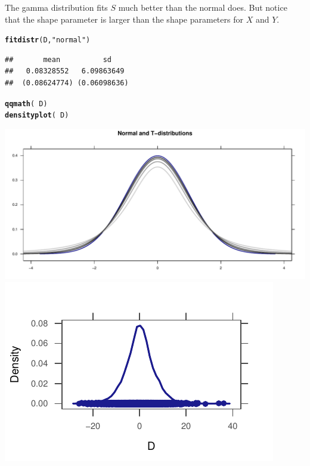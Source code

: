 \documentclass[twoside]{book}\usepackage[]{graphicx}\usepackage[]{xcolor}
\makeatletter
\def\maxwidth{ %
  \ifdim\Gin@nat@width>\linewidth
    \linewidth
  \else
    \Gin@nat@width
  \fi
}
\newcommand{\hlstr}[1]{\textcolor[rgb]{0.192,0.494,0.8}{#1}}%
\newcommand{\hlopt}[1]{\textcolor[rgb]{0,0,0}{#1}}%
\newcommand{\hlstd}[1]{\textcolor[rgb]{0.345,0.345,0.345}{#1}}%
\newcommand{\hlkwd}[1]{\textcolor[rgb]{0.737,0.353,0.396}{\textbf{#1}}}%
\newenvironment{kframe}{%
 \def\at@end@of@kframe{}%
 \ifinner\ifhmode%
  \def\at@end@of@kframe{\end{minipage}}%
  \begin{minipage}{\columnwidth}%
 \fi\fi%
 \def\FrameCommand##1{\hskip\@totalleftmargin \hskip-\fboxsep
 \colorbox{shadecolor}{##1}\hskip-\fboxsep
     \hskip-\linewidth \hskip-\@totalleftmargin \hskip\columnwidth}%
 \MakeFramed {\advance\hsize-\width
   \@totalleftmargin\z@ \linewidth\hsize
   \@setminipage}}%
 {\par\unskip\endMakeFramed%
 \at@end@of@kframe}
\newenvironment{knitrout}{}{} %
\makeatother
\begin{document}
\begin{solution}
\begin{knitrout}
{}



\end{knitrout}
The gamma distribution fits $S$ much better than the normal does.  But notice that the 
shape parameter is larger than the shape parameters for $X$ and $Y$.

\begin{knitrout}
\color{fgcolor}\begin{kframe}
\begin{alltt}
\hlkwd{fitdistr}\hlstd{(D,} \hlstr{"normal"}\hlstd{)}
\end{alltt}
\begin{verbatim}
##       mean          sd    
##   0.08328552   6.09863649 
##  (0.08624774) (0.06098636)
\end{verbatim}
\begin{alltt}
\hlkwd{qqmath}\hlstd{(}\hlopt{~}\hlstd{D)}
\hlkwd{densityplot}\hlstd{(}\hlopt{~}\hlstd{D)}
\end{alltt}
\end{kframe}

{\centering \includegraphics[width=\maxwidth]{figures/fig-unnamed-chunk-130-1} 
\includegraphics[width=\maxwidth]{figures/fig-unnamed-chunk-130-2} 

}
\end{knitrout}
\end{solution}
\end{document}
